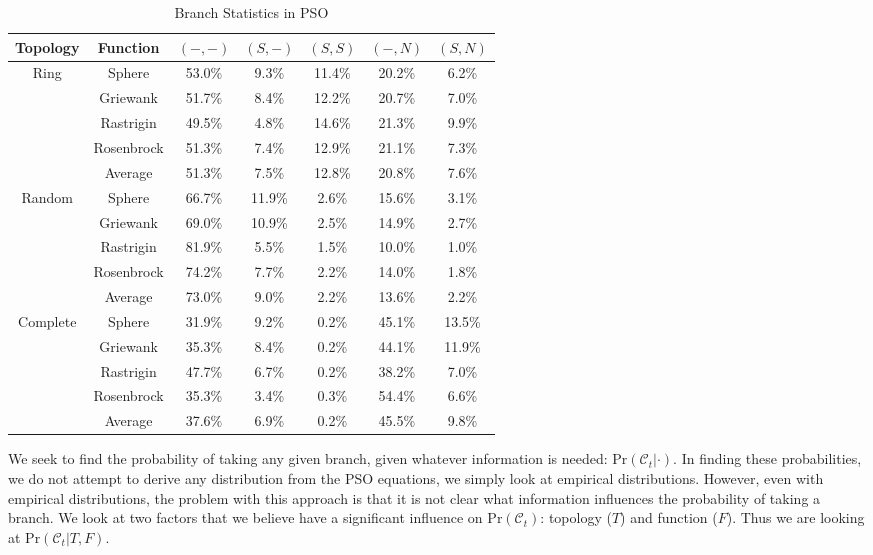 \documentclass[smallcondensed]{svjour3}
\providecommand{\caseset}{\ensuremath{\mathcal{C}}}
\providecommand{\casexn}{\ensuremath{(S,-)}}
\providecommand{\casexx}{\ensuremath{(S,S)}}
\providecommand{\casepn}{\ensuremath{(-,-)}}
\providecommand{\casepN}{\ensuremath{(-,N)}}
\providecommand{\casexN}{\ensuremath{(S,N)}}
\providecommand{\prob}{\ensuremath{\mathrm{Pr}}}
\begin{document}
\begin{table}[ht]
  \caption{Branch Statistics in PSO}
  \label{tab:stats}
  \centering
  \scriptsize
  \begin{tabular}{c|c|c|c|c|c|c|}
	Topology&Function&\casepn&\casexn&\casexx&\casepN&\casexN\\
	\hline
	\hline
	Ring&Sphere&53.0\%&9.3\%&11.4\%&20.2\%&6.2\%\\
	&Griewank&51.7\%&8.4\%&12.2\%&20.7\%&7.0\%\\
	&Rastrigin&49.5\%&4.8\%&14.6\%&21.3\%&9.9\%\\
	&Rosenbrock&51.3\%&7.4\%&12.9\%&21.1\%&7.3\%\\
	\cline{2-7}
	&Average&{51.3\%}&{7.5\%}&{12.8\%}&{20.8\%}&
	{7.6\%}\\
	\hline
	\hline
	Random&Sphere&66.7\%&11.9\%&2.6\%&15.6\%&3.1\%\\
	&Griewank&69.0\%&10.9\%&2.5\%&14.9\%&2.7\%\\
	&Rastrigin&81.9\%&5.5\%&1.5\%&10.0\%&1.0\%\\
	&Rosenbrock&74.2\%&7.7\%&2.2\%&14.0\%&1.8\%\\
	\cline{2-7}
	&Average&{73.0\%}&{9.0\%}&{2.2\%}&{13.6\%}&
	{2.2\%}\\
	\hline
	\hline
	Complete&Sphere&31.9\%&9.2\%&0.2\%&45.1\%&13.5\%\\
	&Griewank&35.3\%&8.4\%&0.2\%&44.1\%&11.9\%\\
	&Rastrigin&47.7\%&6.7\%&0.2\%&38.2\%&7.0\%\\
	&Rosenbrock&35.3\%&3.4\%&0.3\%&54.4\%&6.6\%\\
	\cline{2-7}
	&Average&{37.6\%}&{6.9\%}&{0.2\%}&{45.5\%}&
	{9.8\%}\\
	\hline
  \end{tabular}
\end{table}

We seek to find the probability of taking any given branch, given whatever
information is needed: $\prob(\caseset_t|\cdot)$.  In finding these
probabilities, we do not attempt to derive any distribution from the PSO
equations, we simply look at empirical distributions.  However, even with
empirical distributions, the problem with this approach is that it is not clear
what information influences the probability of taking a branch.  We look at two
factors that we believe have a significant influence on $\prob(\caseset_t)$:
topology ($T$) and function ($F$).  Thus we are looking at
$\prob(\caseset_t|T,F)$.
\end{document}
